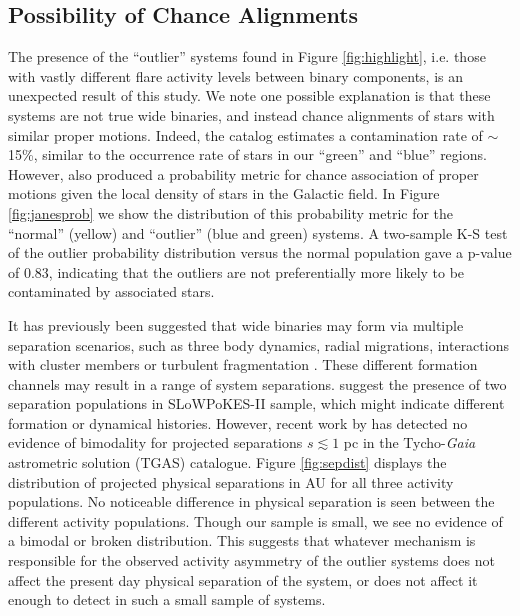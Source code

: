 \documentclass[preprint2]{aastex61}
\begin{document}
\subsection{Possibility of Chance Alignments}

The presence of the ``outlier'' systems found in Figure \ref{fig:highlight}, i.e. those with vastly different flare activity levels between binary components, is an unexpected result of this study. We note one possible explanation is that these systems are not true wide binaries, and instead chance alignments of stars with similar proper motions. Indeed, the \citet{janes2017} catalog estimates a contamination rate of $\sim$15\%, similar to the occurrence rate of stars in our ``green'' and ``blue'' regions. However, \citet{janes2017} also produced a probability metric for chance association of proper motions given the local density of stars in the  Galactic field. In Figure \ref{fig:janesprob} we show the distribution of this probability metric for the ``normal'' (yellow) and ``outlier'' (blue and green) systems. A two-sample K-S test of the outlier probability distribution versus the normal population gave a p-value of 0.83, indicating that the outliers are not preferentially more likely to be contaminated by associated stars. 

It has previously been suggested that wide binaries may form via multiple separation scenarios, such as three body dynamics, radial migrations, interactions with cluster members or turbulent fragmentation \citep{lee2017}. These different formation channels may result in a range of system separations. \citet{dhital2015} suggest the presence of two separation populations in SLoWPoKES-II sample, which might indicate different formation or dynamical histories. However, recent work by \citet{andrews2017} has detected no evidence of bimodality for projected separations $s \lesssim 1$ pc in the Tycho-\textit{Gaia} astrometric solution (TGAS) catalogue. Figure \ref{fig:sepdist} displays the distribution of projected physical separations in AU for all three activity populations. No noticeable difference in physical separation is seen between the different activity populations. Though our sample is small, we see no evidence of a bimodal or broken distribution. This suggests that whatever mechanism is responsible for the observed activity asymmetry of the outlier systems does not affect the present day physical separation of the system, or does not affect it enough to detect in such a small sample of systems.
\end{document}
